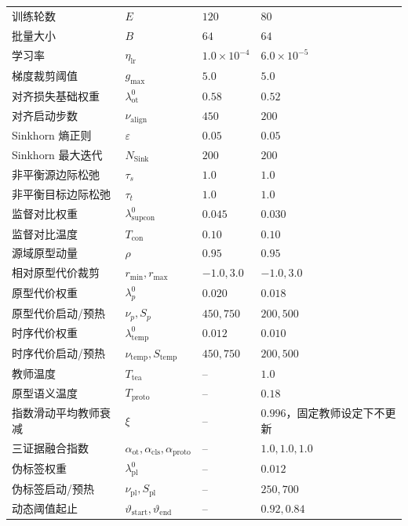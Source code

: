 \documentclass{seuthesis-2022}
\begin{document}
{\begin{longtable}{@{}>{\raggedright\arraybackslash}p{}>{\raggedright\arraybackslash}p{}>{\raggedright\arraybackslash}p{}>{\raggedright\arraybackslash}p{}@{}}
    训练轮数 & $E$ & $120$ & $80$ \\
    批量大小 & $B$ & $64$ & $64$ \\
    学习率 & $\eta_{\mathrm{lr}}$ & $1.0\times10^{-4}$ & $6.0\times10^{-5}$ \\
    梯度裁剪阈值 & $g_{\max}$ & $5.0$ & $5.0$ \\
    对齐损失基础权重 & $\lambda_{\mathrm{ot}}^0$ & $0.58$ & $0.52$ \\
    对齐启动步数 & $\nu_{\mathrm{align}}$ & $450$ & $200$ \\
    Sinkhorn 熵正则 & $\varepsilon$ & $0.05$ & $0.05$ \\
    Sinkhorn 最大迭代 & $N_{\mathrm{Sink}}$ & $200$ & $200$ \\
    非平衡源边际松弛 & $\tau_s$ & $1.0$ & $1.0$ \\
    非平衡目标边际松弛 & $\tau_t$ & $1.0$ & $1.0$ \\
    监督对比权重 & $\lambda_{\mathrm{supcon}}^0$ & $0.045$ & $0.030$ \\
    监督对比温度 & $T_{\mathrm{con}}$ & $0.10$ & $0.10$ \\
    源域原型动量 & $\rho$ & $0.95$ & $0.95$ \\
    相对原型代价裁剪 & $r_{\min},r_{\max}$ & $-1.0,3.0$ & $-1.0,3.0$ \\
    原型代价权重 & $\lambda_p^0$ & $0.020$ & $0.018$ \\
    原型代价启动/预热 & $\nu_p,S_p$ & $450,750$ & $200,500$ \\
    时序代价权重 & $\lambda_{\mathrm{temp}}^0$ & $0.012$ & $0.010$ \\
    时序代价启动/预热 & $\nu_{\mathrm{temp}},S_{\mathrm{temp}}$ & $450,750$ & $200,500$ \\
    教师温度 & $T_{\mathrm{tea}}$ & -- & $1.0$ \\
    原型语义温度 & $T_{\mathrm{proto}}$ & -- & $0.18$ \\
    指数滑动平均教师衰减 & $\xi$ & -- & $0.996$，固定教师设定下不更新 \\
    三证据融合指数 & $\alpha_{\mathrm{ot}},\alpha_{\mathrm{cls}},\alpha_{\mathrm{proto}}$ & -- & $1.0,1.0,1.0$ \\
    伪标签权重 & $\lambda_{\mathrm{pl}}^0$ & -- & $0.012$ \\
    伪标签启动/预热 & $\nu_{\mathrm{pl}},S_{\mathrm{pl}}$ & -- & $250,700$ \\
    动态阈值起止 & $\vartheta_{\mathrm{start}},\vartheta_{\mathrm{end}}$ & -- & $0.92,0.84$ \\

\end{longtable}}
\end{document}
